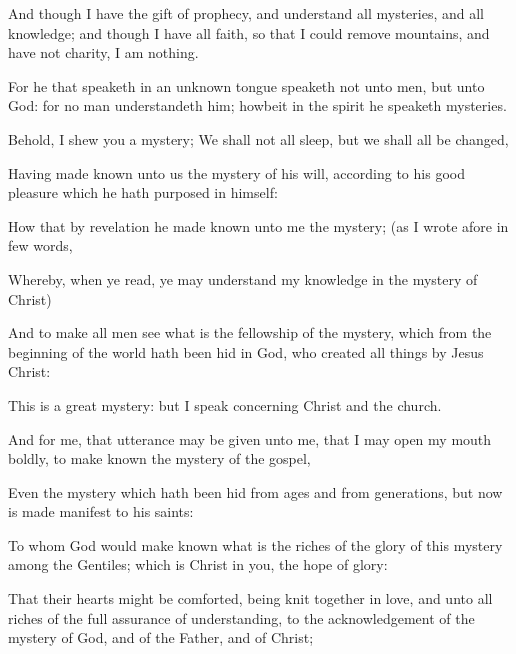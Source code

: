 \begin{compactdesc}
				\item[{\hyperref[1CORINTHIANS-13-2]{1 Corinthians 13:2}}] And though I have the gift of prophecy, and understand all mysteries, and all knowledge; and though I have all faith, so that I could remove mountains, and have not charity, I am nothing.
				\item[{\hyperref[1CORINTIHANS-14-2]{1 Corinthians 14:2}}] For he that speaketh in an unknown tongue speaketh not unto men, but unto God: for no man understandeth him; howbeit in the spirit he speaketh mysteries.
				\item[{\hyperref[1CORINTHIANS-15-51]{1 Corinthians 15:51}}] Behold, I shew you a mystery; We shall not all sleep, but we shall all be changed,
				\item[{\hyperref[EPHESIANS-1-9]{Ephesians 1:9}}] Having made known unto us the mystery of his will, according to his good pleasure which he hath purposed in himself:
				\item[{\hyperref[EPHESIANS-3-3]{Ephesians 3:3}}] How that by revelation he made known unto me the mystery; (as I wrote afore in few words,
				\item[{\hyperref[EPHESIANS-3-4]{Ephesians 3:4}}] Whereby, when ye read, ye may understand my knowledge in the mystery of Christ)
				\item[{\hyperref[EPHESIANS-3-9]{Ephesians 3:9}}] And to make all men see what is the fellowship of the mystery, which from the beginning of the world hath been hid in God, who created all things by Jesus Christ:
				\item[{\hyperref[EPHESIANS-5-32]{Ephesians 5:32}}] This is a great mystery: but I speak concerning Christ and the church.
				\item[{\hyperref[EPHESIANS-6-19]{Ephesians 6:19}}] And for me, that utterance may be given unto me, that I may open my mouth boldly, to make known the mystery of the gospel,
				\item[{\hyperref[COLOSSIANS-1-26]{Colossians 1:26}}] Even the mystery which hath been hid from ages and from generations, but now is made manifest to his saints:
				\item[{\hyperref[COLOSSIANS-1-27]{Colossians 1:27}}] To whom God would make known what is the riches of the glory of this mystery among the Gentiles; which is Christ in you, the hope of glory:
				\item[{\hyperref[COLOSSIANS-2-2]{Colossians 2:2}}] That their hearts might be comforted, being knit together in love, and unto all riches of the full assurance of understanding, to the acknowledgement of the mystery of God, and of the Father, and of Christ;

\end{compactdesc}
